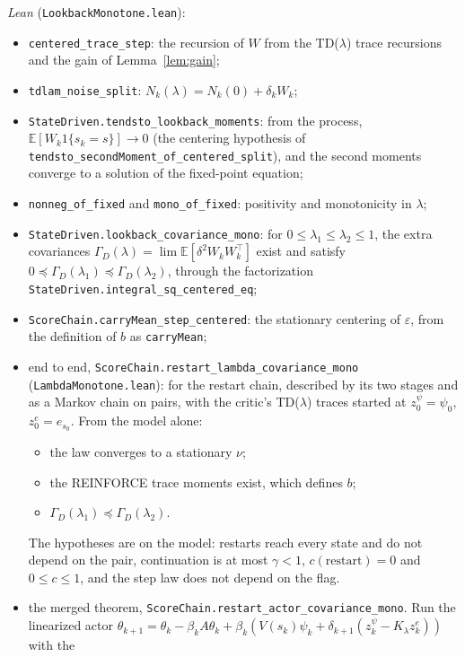 \documentclass[11pt]{article}
\theoremstyle{definition}
\theoremstyle{remark}
\newcommand{\E}{\mathbb{E}}
\begin{document}
\noindent\emph{Lean} (\texttt{LookbackMonotone.lean}):
\begin{itemize}
\item \texttt{centered\_trace\_step}: the recursion of $W$ from the TD($\lambda$) trace recursions and the gain of
  Lemma~\ref{lem:gain};
\item \texttt{tdlam\_noise\_split}: $N_k(\lambda) = N_k(0) + \delta_kW_k$;
\item \texttt{StateDriven.tendsto\_lookback\_moments}: from the process, $\E[W_k1\{s_k = s\}] \to 0$ (the
  centering hypothesis of \texttt{tendsto\_secondMoment\_of\_centered\_split}), and the second moments
  converge to a solution of the fixed-point equation;
\item \texttt{nonneg\_of\_fixed} and \texttt{mono\_of\_fixed}: positivity and monotonicity in $\lambda$;
\item \texttt{StateDriven.lookback\_covariance\_mono}: for $0 \le \lambda_1 \le \lambda_2 \le 1$, the extra
  covariances $\Gamma_D(\lambda) = \lim\E[\delta^2W_kW_k^\top]$ exist and satisfy $0 \preceq \Gamma_D(\lambda_1) \preceq
  \Gamma_D(\lambda_2)$, through the factorization \texttt{StateDriven.integral\_sq\_centered\_eq};
\item \texttt{ScoreChain.carryMean\_step\_centered}: the stationary centering of $\varepsilon$, from the
  definition of $b$ as \texttt{carryMean};
\item end to end, \texttt{ScoreChain.restart\_lambda\_covariance\_mono} (\texttt{LambdaMonotone.lean}): for
  the restart chain, described by its two stages and as a Markov chain on pairs, with the critic's
  TD($\lambda$) traces started at $z^\psi_0 = \psi_0$, $z^e_0 = e_{s_0}$. From the model alone:
  \begin{itemize}
  \item the law converges to a stationary $\nu$;
  \item the REINFORCE trace moments exist, which defines $b$;
  \item $\Gamma_D(\lambda_1) \preceq \Gamma_D(\lambda_2)$.
  \end{itemize}
  The hypotheses are on the model: restarts reach every state and do not depend on the pair,
  continuation is at most $\gamma < 1$, $c(\text{restart}) = 0$ and $0 \le c \le 1$, and the step law
  does not depend on the flag.
\item the merged theorem, \texttt{ScoreChain.restart\_actor\_covariance\_mono}. Run the linearized actor
  $\theta_{k+1} = \theta_k - \beta_kA\theta_k + \beta_k(V(s_k)\psi_k + \delta_{k+1}(z^\psi_k - K_\lambda z^e_k))$ with the

\end{itemize}
\end{document}
